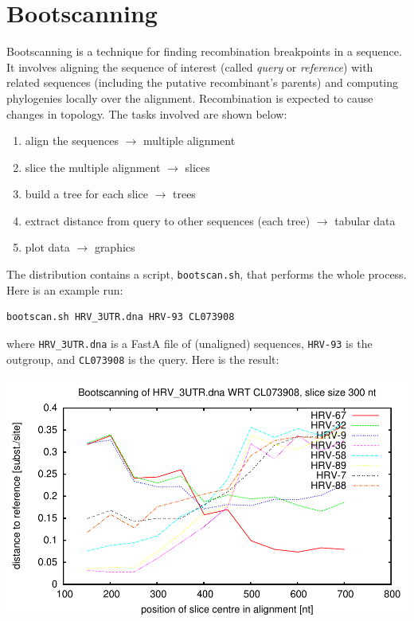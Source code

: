 \section{Bootscanning}
\label{sct_bootscanning}

Bootscanning is a technique for finding recombination breakpoints in a
sequence. It involves aligning the sequence of interest (called \emph{query} or
\emph{reference}) with related sequences (including the putative recombinant's
parents) and computing phylogenies locally over the alignment. Recombination is
expected to cause changes in topology.  The tasks involved are shown below:
\begin{enumerate}
\item align the sequences $\rightarrow$ multiple alignment
\item slice the multiple alignment $\rightarrow$ slices
\item build a tree for each slice $\rightarrow$ trees
\item extract distance from query to other sequences (each tree) $\rightarrow$ tabular data
\item plot data $\rightarrow$ graphics
\end{enumerate}
The distribution contains a script, \texttt{bootscan.sh}, that performs the whole process. Here is an example run:
\begin{verbatim}
bootscan.sh HRV_3UTR.dna HRV-93 CL073908
\end{verbatim}
where \texttt{HRV\_3UTR.dna} is a FastA file of (unaligned) sequences, \texttt{HRV-93} is the outgroup, and \texttt{CL073908} is the query.  Here is the result:

\begin{centering}
\includegraphics[scale=0.7]{bootscan_1.pdf}
\end{centering}
